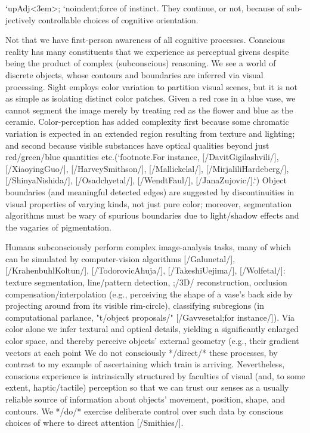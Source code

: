 `upAdj<3em>;
`noindent;force of instinct.  They continue, or not, because of sub-
jectively controllable choices of cognitive orientation.

Not that we have first-person awareness of all cognitive 
processes.  Conscious reality has many constituents 
that we experience as perceptual givens despite being the product of 
complex (subconscious) reasoning.  We see a world of discrete objects, 
whose contours and boundaries are inferred via visual processing.  
Sight employs color variation to partition visual scenes, but 
it is not as simple as isolating distinct color patches.  Given a 
red rose in a blue vase, we cannot segment the image merely by 
treating red as the flower and blue as the ceramic.  
Color-perception has added complexity first because some chromatic 
variation is expected in an extended region resulting from texture 
and lighting; and second because visible substances have 
optical qualities beyond just red/green/blue quantities 
etc.(`footnote.For instance, [/DavitGigilashvili/], [/XiaoyingGuo/], 
[/HarveySmithson/], [/Mallickelal/], [/MirjaliliHardeberg/], 
[/ShinyaNishida/], [/Osadchyetal/], [/WendtFaul/], [/JanaZujovic/].`)
Object boundaries (and meaningful detected edges) are 
suggested by discontinuities in visual properties of 
varying kinds, not just pure color; moreover, segmentation 
algorithms must be wary of spurious boundaries 
due to light/shadow effects and the vagaries of pigmentation. 

Humans subconsciously perform complex image-analysis tasks, many 
of which can be simulated by computer-vision algorithms [/Galunetal/], 
[/KrahenbuhlKoltun/], 
[/TodorovicAhuja/], [/TakeshiUejima/], [/Wolfetal/]: 
texture segmentation, line/pattern detection, ;/3D/ reconstruction, occlusion compensation/interpolation  
(e.g., perceiving the shape of a vase's back side by projecting 
around from its visible rim-circle), classifying 
subregions (in computational parlance, "t/object proposals/" [/Gavvesetal;for instance/]). 
Via color alone we infer textural and optical details, yielding a significantly 
enlarged color space, and thereby perceive objects' external 
geometry (e.g., their gradient vectors at each point 
We do not consciously */direct/* these processes, by contrast to 
my example of ascertaining which train is arriving.  Nevertheless, 
conscious experience is intrinsically structured by 
faculties of visual (and, to some extent, haptic/tactile) 
perception so that we can trust our senses as a usually 
reliable source of information about objects' movement, 
position, shape, and contours.  We */do/* exercise deliberate 
control over such data by conscious choices of where to 
direct attention [/Smithies/].

